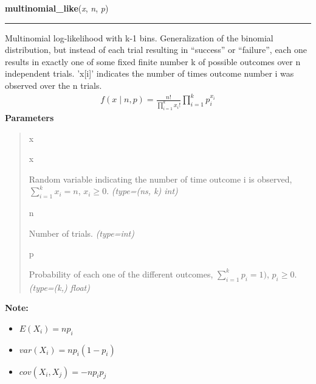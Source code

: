 \hspace{.8\funcindent}\begin{boxedminipage}{\funcwidth}

    \raggedright \textbf{multinomial\_like}(\textit{x}, \textit{n}, \textit{p})

    \vspace{-1.5ex}

    \rule{\textwidth}{1pt}
\setlength{\parskip}{2ex}

Multinomial log-likelihood with k-1 bins. Generalization of the binomial
distribution, but instead of each trial resulting in ``success'' or
``failure'', each one results in exactly one of some fixed finite number k
of possible outcomes over n independent trials. 'x{[}i{]}' indicates the number
of times outcome number i was observed over the n trials.
\begin{equation*}\begin{split}f(x \mid n, p) = \frac{n!}{\prod_{i=1}^k x_i!} \prod_{i=1}^k p_i^{x_i}\end{split}\end{equation*}\setlength{\parskip}{1ex}
      \textbf{Parameters}
      \vspace{-1ex}

      \begin{quote}
        \begin{Ventry}{x}

          \item[x]


Random variable indicating the number of time outcome i is observed,
$\sum_{i=1}^k x_i=n$, $x_i \ge 0$.
            {\it (type=(ns, k) int)}

          \item[n]


Number of trials.
            {\it (type=int)}

          \item[p]


Probability of each one of the different outcomes,
$\sum_{i=1}^k p_i = 1)$, $p_i \ge 0$.
            {\it (type=(k,) float)}

        \end{Ventry}

      \end{quote}

\textbf{Note:} \begin{itemize}
\item {} 
$E(X_i)=n p_i$

\item {} 
$var(X_i)=n p_i(1-p_i)$

\item {} 
$cov(X_i,X_j) = -n p_i p_j$

\end{itemize}


    \end{boxedminipage}

